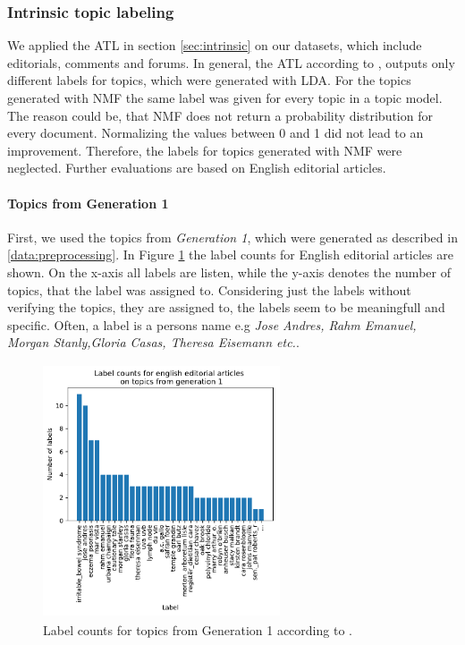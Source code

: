 {\subsubsection{Intrinsic topic labeling}
\label{eval:intrinsic}
We applied the \ac{ATL} in section \ref{sec:intrinsic} on our datasets, which include editorials, comments and forums. In general, the \ac{ATL} according to \cite{Mei2007}, outputs only different labels for topics, which were generated with \ac{LDA}. For the topics generated with \ac{NMF} the same label was given for every topic in a topic model. The reason could be, that \ac{NMF} does not return a probability distribution for every document. Normalizing the values between 0 and 1 did not lead to an improvement. Therefore, the labels for topics generated with \ac{NMF} were neglected. Further evaluations are based on English editorial articles. 
\paragraph{Topics from Generation 1}
First, we used the topics from \textit{Generation 1}, which were generated as described in \ref{data:preprocessing}. In Figure \ref{fig:labelcount_intrinsic} the label counts for English editorial articles are shown. On the x-axis all labels are listen, while the y-axis denotes the number of topics, that the label was assigned to. 
Considering just  the labels without verifying the topics, they are assigned to, the labels seem to be meaningfull and specific. Often, a label is a persons name e.g {\textit{Jose Andres, Rahm Emanuel, Morgan Stanly,Gloria Casas, Theresa Eisemann etc.}}.
\begin{figure}[h]
	\centering
	\includegraphics[width=7cm,height=7.5cm]{gfx/POS-gen1/alte_topics.pdf}
	\caption[Label counts for topics from Generation 1 with intrinsic labeling]{Label counts for topics from Generation 1 according to \cite{Mei2007}.}
	\label{fig:labelcount_intrinsic}
\end{figure}

}
